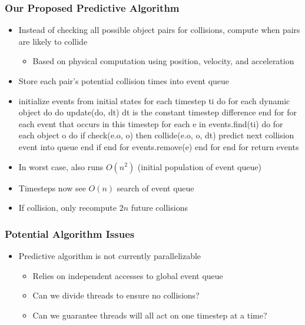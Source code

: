 \documentclass{beamer}
\begin{document}
\begin{frame}
	\frametitle{Our Proposed Predictive Algorithm}
	\begin{itemize}
		\item Instead of checking all possible object pairs for collisions, compute when pairs are likely to collide
		\begin{itemize}
			\item Based on physical computation using position, velocity, and acceleration
		\end{itemize}
		\item Store each pair's potential collision times into event queue
		\item
{initialize events from initial states}
for each timestep ti do
  for each dynamic object do do
    update(do, dt) {dt is the constant timestep difference}
  end for
  {for each event that occurs in this timestep}
  for each e in events.find(ti) do
    for each object o do
      if check(e.o, o) then
        collide(e.o, o, dt) {predict next collision event into queue}
      end if
    end for
    events.remove(e)
  end for
end for
return events

	\item In worst case, also runs $O(n ^ 2)$ (initial population of event queue)
	\item Timesteps now see $O(n)$ search of event queue
	\item If collision, only recompute $2n$ future collisions
	\end{itemize}

\end{frame}

\begin{frame}
	\frametitle{Potential Algorithm Issues}
	\begin{itemize}
		\item Predictive algorithm is not currently parallelizable
		\begin{itemize}
			\item Relies on independent accesses to global event queue
			\item Can we divide threads to ensure no collisions?
			\item Can we guarantee threads will all act on one timestep at a time?
		\end{itemize}
	\end{itemize}
\end{frame}
\end{document}
